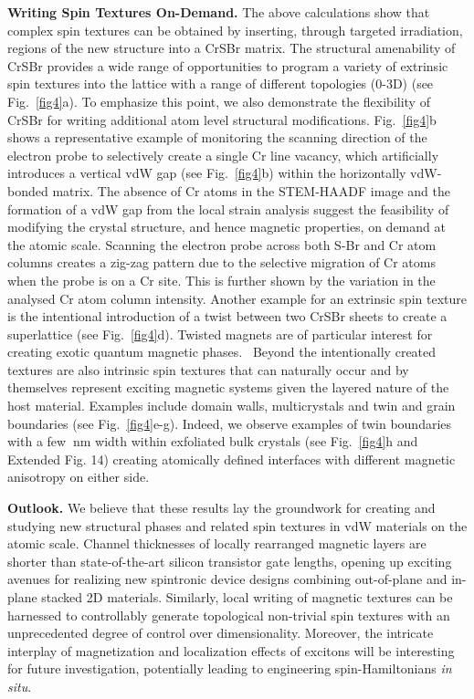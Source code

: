 \documentclass[aps,prl,showpacs,twocolumn,superscriptaddress,floatfix]{revtex4-2}
\begin{document}
\textbf{Writing Spin Textures On-Demand.} The above calculations show that complex spin textures can be obtained by inserting, through targeted irradiation, regions of the new structure into a CrSBr matrix. The structural amenability of CrSBr provides a wide range of opportunities to program a variety of extrinsic spin textures into the lattice with a range of different topologies (0-3D) (see Fig.~\ref{fig4}a). To emphasize this point, we also demonstrate the flexibility of CrSBr for writing additional atom level structural modifications. Fig.~\ref{fig4}b shows a representative example of monitoring the scanning direction of the electron probe to selectively create a single Cr line vacancy, which artificially introduces a vertical vdW gap (see Fig.~\ref{fig4}b) within the horizontally vdW-bonded matrix. The absence of Cr atoms in the STEM-HAADF image and the formation of a vdW gap from the local strain analysis suggest the feasibility of modifying the crystal structure, and hence magnetic properties, on demand at the atomic scale. Scanning the electron probe across both S-Br and Cr atom columns creates a zig-zag pattern due to the selective migration of Cr atoms when the probe is on a Cr site. This is further shown by the variation in the analysed Cr atom column intensity. Another example for an extrinsic spin texture is the intentional introduction of a twist between two CrSBr sheets to create a superlattice (see Fig.~\ref{fig4}d). Twisted magnets are of particular interest for creating exotic quantum magnetic phases.~\cite{Hejazi.2020} Beyond the intentionally created textures are also intrinsic spin textures that can naturally occur and by themselves represent exciting magnetic systems given the layered nature of the host material. Examples include domain walls, multicrystals and twin and grain boundaries (see Fig.~\ref{fig4}e-g). Indeed, we observe examples of twin boundaries with a few $\SI{}{\nano\meter}$ width within exfoliated bulk crystals (see Fig.~\ref{fig4}h and Extended Fig. 14) creating atomically defined interfaces with different magnetic anisotropy on either side.

\textbf{Outlook.} We believe that these results lay the groundwork for creating and studying new structural phases and related spin textures in vdW materials on the atomic scale. Channel thicknesses of locally rearranged magnetic layers are shorter than state-of-the-art silicon transistor gate lengths, opening up exciting avenues for realizing new spintronic device designs combining out-of-plane and in-plane stacked 2D materials. Similarly, local writing of magnetic textures can be harnessed to controllably generate topological non-trivial spin textures with an unprecedented degree of control over dimensionality. Moreover, the intricate interplay of magnetization and localization effects of excitons will be interesting for future investigation, potentially leading to engineering spin-Hamiltonians \emph{in situ}.
\end{document}
